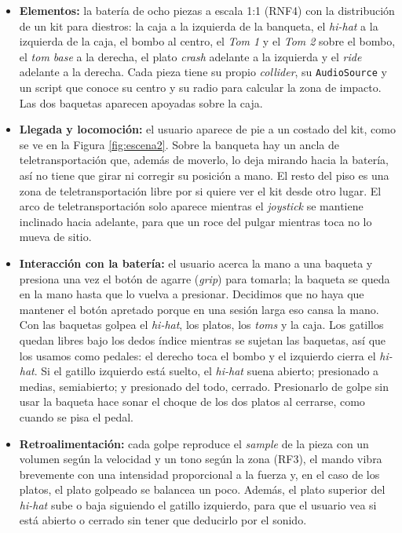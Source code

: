 \documentclass{article}
\begin{document}
\begin{itemize}
    \item \textbf{Elementos:} la batería de ocho piezas a escala 1:1 (RNF4) con la distribución de un kit para diestros: la caja a la izquierda de la banqueta, el \textit{hi-hat} a la izquierda de la caja, el bombo al centro, el \textit{Tom 1} y el \textit{Tom 2} sobre el bombo, el \textit{tom base} a la derecha, el plato \textit{crash} adelante a la izquierda y el \textit{ride} adelante a la derecha. Cada pieza tiene su propio \textit{collider}, su \texttt{AudioSource} y un script que conoce su centro y su radio para calcular la zona de impacto. Las dos baquetas aparecen apoyadas sobre la caja.
    \item \textbf{Llegada y locomoción:} el usuario aparece de pie a un costado del kit, como se ve en la Figura \ref{fig:escena2}. Sobre la banqueta hay un ancla de teletransportación que, además de moverlo, lo deja mirando hacia la batería, así no tiene que girar ni corregir su posición a mano. El resto del piso es una zona de teletransportación libre por si quiere ver el kit desde otro lugar. El arco de teletransportación solo aparece mientras el \textit{joystick} se mantiene inclinado hacia adelante, para que un roce del pulgar mientras toca no lo mueva de sitio.
    \item \textbf{Interacción con la batería:} el usuario acerca la mano a una baqueta y presiona una vez el botón de agarre (\textit{grip}) para tomarla; la baqueta se queda en la mano hasta que lo vuelva a presionar. Decidimos que no haya que mantener el botón apretado porque en una sesión larga eso cansa la mano. Con las baquetas golpea el \textit{hi-hat}, los platos, los \textit{toms} y la caja. Los gatillos quedan libres bajo los dedos índice mientras se sujetan las baquetas, así que los usamos como pedales: el derecho toca el bombo y el izquierdo cierra el \textit{hi-hat}. Si el gatillo izquierdo está suelto, el \textit{hi-hat} suena abierto; presionado a medias, semiabierto; y presionado del todo, cerrado. Presionarlo de golpe sin usar la baqueta hace sonar el choque de los dos platos al cerrarse, como cuando se pisa el pedal.
    \item \textbf{Retroalimentación:} cada golpe reproduce el \textit{sample} de la pieza con un volumen según la velocidad y un tono según la zona (RF3), el mando vibra brevemente con una intensidad proporcional a la fuerza y, en el caso de los platos, el plato golpeado se balancea un poco. Además, el plato superior del \textit{hi-hat} sube o baja siguiendo el gatillo izquierdo, para que el usuario vea si está abierto o cerrado sin tener que deducirlo por el sonido.

\end{itemize}
\end{document}
